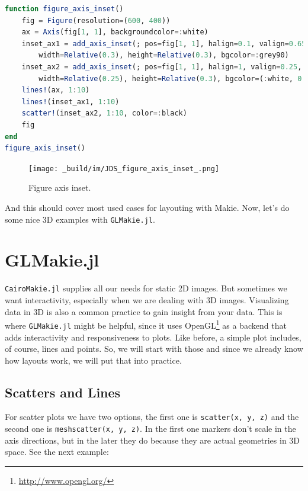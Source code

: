 \documentclass[
  notoc %
]{tufte-book}
\DeclareRobustCommand{\href}[2]{#2\footnote{\url{#1}}}
\newcommand{\passthrough}[1]{#1}
\begin{document}
\begin{lstlisting}[language=Julia]
function figure_axis_inset()
    fig = Figure(resolution=(600, 400))
    ax = Axis(fig[1, 1], backgroundcolor=:white)
    inset_ax1 = add_axis_inset(; pos=fig[1, 1], halign=0.1, valign=0.65,
        width=Relative(0.3), height=Relative(0.3), bgcolor=:grey90)
    inset_ax2 = add_axis_inset(; pos=fig[1, 1], halign=1, valign=0.25,
        width=Relative(0.25), height=Relative(0.3), bgcolor=(:white, 0.65))
    lines!(ax, 1:10)
    lines!(inset_ax1, 1:10)
    scatter!(inset_ax2, 1:10, color=:black)
    fig
end
figure_axis_inset()
\end{lstlisting}

\begin{figure}
\hypertarget{fig:figure_axis_inset}{%
\centering
\texttt{[image: \_build/im/JDS\_figure\_axis\_inset\_.png]}
\caption{Figure axis inset.}\label{fig:figure_axis_inset}
}
\end{figure}

And this should cover most used cases for layouting with Makie. Now,
let's do some nice 3D examples with
\passthrough{\lstinline!GLMakie.jl!}.

\hypertarget{sec:glmakie}{%
\section{GLMakie.jl}\label{sec:glmakie}}

\passthrough{\lstinline!CairoMakie.jl!} supplies all our needs for
static 2D images. But sometimes we want interactivity, especially when
we are dealing with 3D images. Visualizing data in 3D is also a common
practice to gain insight from your data. This is where
\passthrough{\lstinline!GLMakie.jl!} might be helpful, since it uses
\href{http://www.opengl.org/}{OpenGL} as a backend that adds
interactivity and responsiveness to plots. Like before, a simple plot
includes, of course, lines and points. So, we will start with those and
since we already know how layouts work, we will put that into practice.

\hypertarget{scatters-and-lines}{%
\subsection{Scatters and Lines}\label{scatters-and-lines}}

For scatter plots we have two options, the first one is
\passthrough{\lstinline!scatter(x, y, z)!} and the second one is
\passthrough{\lstinline!meshscatter(x, y, z)!}. In the first one markers
don't scale in the axis directions, but in the later they do because
they are actual geometries in 3D space. See the next example:
\end{document}
